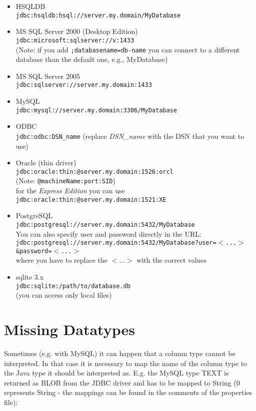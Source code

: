 \begin{itemize}
	\item HSQLDB \\
	\texttt{jdbc:hsqldb:hsql://server.my.domain/MyDatabase}
	\item MS SQL Server 2000 (Desktop Edition) \\
	\texttt{jdbc:microsoft:sqlserver://v:1433} \\
	(Note: if you add \texttt{;databasename=db-name} you can connect to a different database than the default one, e.g., MyDatabase)
	\item MS SQL Server 2005 \\
	\texttt{jdbc:sqlserver://server.my.domain:1433}
	\item MySQL \\
	\texttt{jdbc:mysql://server.my.domain:3306/MyDatabase}
	\item ODBC \\
	\texttt{jdbc:odbc:DSN\_name} (replace \textit{DSN\_name} with the DSN that you want to use)
	\item Oracle (thin driver) \\
	\texttt{jdbc:oracle:thin:@server.my.domain:1526:orcl} \\
	(Note: \texttt{@machineName:port:SID}) \\
	for the \textit{Express Edition} you can use \\
	\texttt{jdbc:oracle:thin:@server.my.domain:1521:XE}
	\item PostgreSQL \\
	\texttt{jdbc:postgresql://server.my.domain:5432/MyDatabase} \\
	You can also specify user and password directly in the URL: \\
	\texttt{jdbc:postgresql://server.my.domain:5432/MyDatabase?user=$<$...$>$\&password=$<$...$>$} \\
	where you have to replace the $<$...$>$ with the correct values
	\item sqlite 3.x \\
	\texttt{jdbc:sqlite:/path/to/database.db} \\
	(you can access only local files)
\end{itemize}

\section{Missing Datatypes}
Sometimes (e.g. with MySQL) it can happen that a column type cannot be interpreted. In that case it is necessary to map the name of the column type to the Java type it should be interpreted as. E.g. the MySQL type TEXT is returned as BLOB from the JDBC driver and has to be mapped to String (0 represents String - the mappings can be found in the comments of the properties file):

